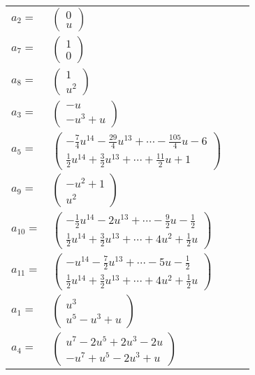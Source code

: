 \documentclass[1p]{elsarticle_modified}
\theoremstyle{definition}
\begin{document}
\begin{tabular}{m{7pt} m{180pt} m{7pt} m{180pt} }
\flushright $a_{2}=$&$\begin{pmatrix}0\\u\end{pmatrix}$ \\
\flushright $a_{7}=$&$\begin{pmatrix}1\\0\end{pmatrix}$ \\
\flushright $a_{8}=$&$\begin{pmatrix}1\\u^2\end{pmatrix}$ \\
\flushright $a_{3}=$&$\begin{pmatrix}- u\\- u^3+u\end{pmatrix}$ \\
\flushright $a_{5}=$&$\begin{pmatrix}-\frac{7}{4} u^{14}-\frac{29}{4} u^{13}+\cdots-\frac{105}{4} u-6\\\frac{1}{2} u^{14}+\frac{3}{2} u^{13}+\cdots+\frac{11}{2} u+1\end{pmatrix}$ \\
\flushright $a_{9}=$&$\begin{pmatrix}- u^2+1\\u^2\end{pmatrix}$ \\
\flushright $a_{10}=$&$\begin{pmatrix}-\frac{1}{2} u^{14}-2 u^{13}+\cdots-\frac{9}{2} u-\frac{1}{2}\\\frac{1}{2} u^{14}+\frac{3}{2} u^{13}+\cdots+4 u^2+\frac{1}{2} u\end{pmatrix}$ \\
\flushright $a_{11}=$&$\begin{pmatrix}- u^{14}-\frac{7}{2} u^{13}+\cdots-5 u-\frac{1}{2}\\\frac{1}{2} u^{14}+\frac{3}{2} u^{13}+\cdots+4 u^2+\frac{1}{2} u\end{pmatrix}$ \\
\flushright $a_{1}=$&$\begin{pmatrix}u^3\\u^5- u^3+u\end{pmatrix}$ \\
\flushright $a_{4}=$&$\begin{pmatrix}u^7-2 u^5+2 u^3-2 u\\- u^7+u^5-2 u^3+u\end{pmatrix}$ \\

\end{tabular}
\end{document}
